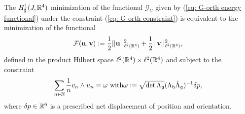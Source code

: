 \begin{proposition}
The $H_{\sharp}^1(J, \mathbb{R}^4)$ minimization of the functional $\mathcal{G}_U$ given by (\ref{eq: G-orth energy functional}) under the constraint (\ref{eq: G-orth constraint}) is equivalent to the minimization of the functional
\begin{equation}
	\mathcal{F}(\mathbf{u}, \mathbf{v}) := \frac{1}{2} ||\mathbf{u} ||^2_{\ell^2(\mathbb{R}^4)} + \frac{1}{2} ||\mathbf{v}||^2_{\ell^2(\mathbb{R}^4)},
\end{equation}
defined in the product Hilbert space $\ell^2(\mathbb{R}^4) \times \ell^2(\mathbb{R}^4)$ and subject to the constraint
\begin{equation}
\sum_{n \in \mathbb{N}} \frac{1}{n} v_n \wedge u_n = \omega \text{ with} \omega := \sqrt{\det \Lambda_{\mathfrak{g}}}(\Lambda_{\mathfrak{h}} \tilde{\Lambda}_{\mathfrak{g}})^{-1} \delta p,
\end{equation}
where $\delta p \in \mathbb{R}^6$ is a prescribed net displacement of position and orientation.
\end{proposition}
